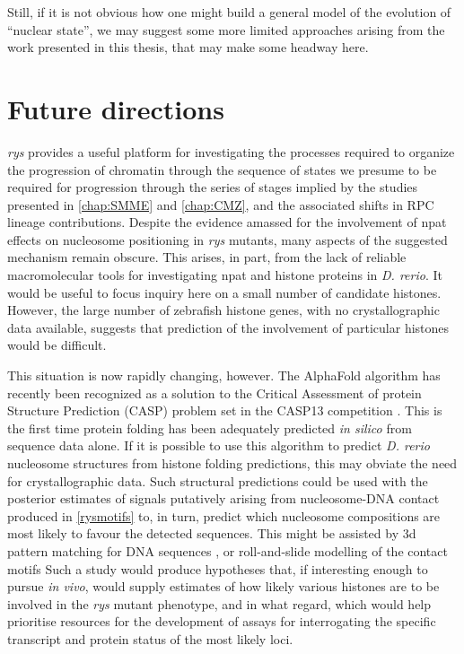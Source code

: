 \documentclass{ut-thesis}
\begin{document}
\begin{NoHyper}
Still, if it is not obvious how one might build a general model of the evolution of ``nuclear state'', we may suggest some more limited approaches arising from the work presented in this thesis, that may make some headway here.

\section{Future directions}
\textit{rys} provides a useful platform for investigating the processes required to organize the progression of chromatin through the sequence of states we presume to be required for progression through the series of stages implied by the studies presented in \autoref{chap:SMME} and \autoref{chap:CMZ}, and the associated shifts in RPC lineage contributions. Despite the evidence amassed for the involvement of npat effects on nucleosome positioning in \textit{rys} mutants, many aspects of the suggested mechanism remain obscure. This arises, in part, from the lack of reliable macromolecular tools for investigating npat and histone proteins in \textit{D. rerio}. It would be useful to focus inquiry here on a small number of candidate histones. However, the large number of zebrafish histone genes, with no crystallographic data available, suggests that prediction of the involvement of particular histones would be difficult.

This situation is now rapidly changing, however. The AlphaFold algorithm has recently been recognized as a solution to the Critical Assessment of protein Structure Prediction (CASP) problem set in the CASP13 competition \cite{AlQuraishi2019}. This is the first time protein folding has been adequately predicted \textit{in silico} from sequence data alone. If it is possible to use this algorithm to predict \textit{D. rerio} nucleosome structures from histone folding predictions, this may obviate the need for crystallographic data. Such structural predictions could be used with the posterior estimates of signals putatively arising from nucleosome-DNA contact produced in \autoref{rysmotifs} to, in turn, predict which nucleosome compositions are most likely to favour the detected sequences. This might be assisted by 3d pattern matching for DNA sequences \cite{Herisson2007}, or roll-and-slide modelling of the contact motifs \cite{Tolstorukov2007} Such a study would produce hypotheses that, if interesting enough to pursue \textit{in vivo}, would supply estimates of how likely various histones are to be involved in the \textit{rys} mutant phenotype, and in what regard, which would help prioritise resources for the development of assays for interrogating the specific transcript and protein status of the most likely loci.


\end{NoHyper}
\end{document}
